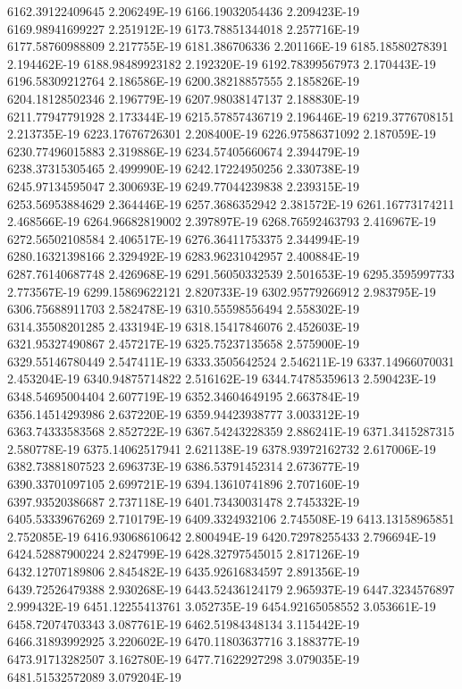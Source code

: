 6162.39122409645  2.206249E-19
6166.19032054436  2.209423E-19
6169.98941699227  2.251912E-19
6173.78851344018  2.257716E-19
6177.58760988809  2.217755E-19
6181.386706336  2.201166E-19
6185.18580278391  2.194462E-19
6188.98489923182  2.192320E-19
6192.78399567973  2.170443E-19
6196.58309212764  2.186586E-19
6200.38218857555  2.185826E-19
6204.18128502346  2.196779E-19
6207.98038147137  2.188830E-19
6211.77947791928  2.173344E-19
6215.57857436719  2.196446E-19
6219.3776708151  2.213735E-19
6223.17676726301  2.208400E-19
6226.97586371092  2.187059E-19
6230.77496015883  2.319886E-19
6234.57405660674  2.394479E-19
6238.37315305465  2.499990E-19
6242.17224950256  2.330738E-19
6245.97134595047  2.300693E-19
6249.77044239838  2.239315E-19
6253.56953884629  2.364446E-19
6257.3686352942  2.381572E-19
6261.16773174211  2.468566E-19
6264.96682819002  2.397897E-19
6268.76592463793  2.416967E-19
6272.56502108584  2.406517E-19
6276.36411753375  2.344994E-19
6280.16321398166  2.329492E-19
6283.96231042957  2.400884E-19
6287.76140687748  2.426968E-19
6291.56050332539  2.501653E-19
6295.3595997733  2.773567E-19
6299.15869622121  2.820733E-19
6302.95779266912  2.983795E-19
6306.75688911703  2.582478E-19
6310.55598556494  2.558302E-19
6314.35508201285  2.433194E-19
6318.15417846076  2.452603E-19
6321.95327490867  2.457217E-19
6325.75237135658  2.575900E-19
6329.55146780449  2.547411E-19
6333.3505642524  2.546211E-19
6337.14966070031  2.453204E-19
6340.94875714822  2.516162E-19
6344.74785359613  2.590423E-19
6348.54695004404  2.607719E-19
6352.34604649195  2.663784E-19
6356.14514293986  2.637220E-19
6359.94423938777  3.003312E-19
6363.74333583568  2.852722E-19
6367.54243228359  2.886241E-19
6371.3415287315  2.580778E-19
6375.14062517941  2.621138E-19
6378.93972162732  2.617006E-19
6382.73881807523  2.696373E-19
6386.53791452314  2.673677E-19
6390.33701097105  2.699721E-19
6394.13610741896  2.707160E-19
6397.93520386687  2.737118E-19
6401.73430031478  2.745332E-19
6405.53339676269  2.710179E-19
6409.3324932106  2.745508E-19
6413.13158965851  2.752085E-19
6416.93068610642  2.800494E-19
6420.72978255433  2.796694E-19
6424.52887900224  2.824799E-19
6428.32797545015  2.817126E-19
6432.12707189806  2.845482E-19
6435.92616834597  2.891356E-19
6439.72526479388  2.930268E-19
6443.52436124179  2.965937E-19
6447.3234576897  2.999432E-19
6451.12255413761  3.052735E-19
6454.92165058552  3.053661E-19
6458.72074703343  3.087761E-19
6462.51984348134  3.115442E-19
6466.31893992925  3.220602E-19
6470.11803637716  3.188377E-19
6473.91713282507  3.162780E-19
6477.71622927298  3.079035E-19
6481.51532572089  3.079204E-19

